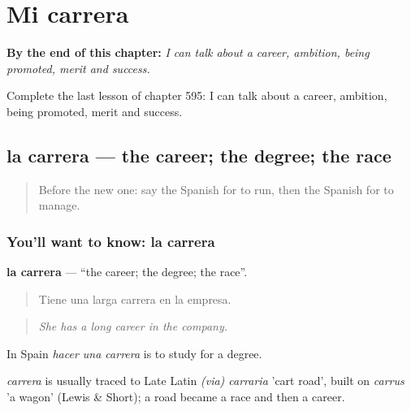 
\chapter{Mi carrera}
\label{ch:es-mi-carrera}

\begin{chapteropening}
\textbf{By the end of this chapter:} \emph{I can talk about a career, ambition, being promoted, merit and success.}

Complete the last lesson of chapter 595: I can talk about a career, ambition, being promoted, merit and success.
\end{chapteropening}

\section[la carrera]{la carrera — the career; the degree; the race}

\label{lesson:ES-C595-carrera}



\begin{quote}
Before the new one: say the Spanish for to run, then the Spanish for to manage.
\end{quote}

\subsection*{You'll want to know: la carrera}
\textbf{la carrera} — \textquotedblleft{}the career; the degree; the race\textquotedblright{}.

\begin{quote}
Tiene una larga carrera en la empresa.
\end{quote}

\begin{quote}
\emph{She has a long career in the company.}
\end{quote}

In Spain \emph{hacer una carrera} is to study for a degree.

\begin{cousinweb}
\emph{carrera} is usually traced to Late Latin \emph{(via) carraria} 'cart road', built on \emph{carrus} 'a wagon' (Lewis \& Short); a road became a race and then a career.
\end{cousinweb}

